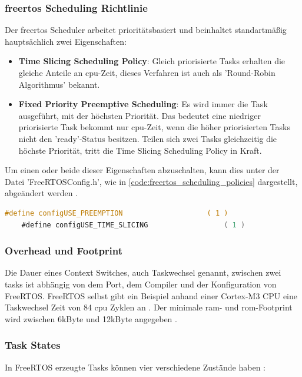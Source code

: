 \documentclass[../EDF Master Thesis.tex]{subfiles}
\begin{document}
\subsubsection{\ac{freertos} Scheduling Richtlinie} \label{section:freertos_scheduling_richtlinie}
Der \ac{freertos} Scheduler arbeitet prioritätsbasiert und beinhaltet standartmäßig hauptsächlich zwei Eigenschaften:
\begin{itemize}
    \item \textbf{Time Slicing Scheduling Policy}: Gleich priorisierte Tasks erhalten die gleiche Anteile an \ac{cpu}-Zeit, dieses Verfahren ist auch als 'Round-Robin Algorithmus' bekannt.
    \item \textbf{Fixed Priority Preemptive Scheduling}: Es wird immer die Task ausgeführt, mit der höchsten Priorität.
                                                         Das bedeutet eine niedriger priorisierte Task bekommt nur \ac{cpu}-Zeit, wenn die höher priorisierten Tasks nicht den 'ready'-Status besitzen.
                                                         Teilen sich zwei Tasks gleichzeitig die höchste Priorität, tritt die Time Slicing Scheduling Policy in Kraft.
\end{itemize}
Um einen oder beide dieser Eigenschaften abzuschalten, kann dies unter der Datei 'FreeRTOSConfig.h', wie in \autoref{code:freertos_scheduling_policies} dargestellt, abgeändert werden \parencite{freertos-scheduling-policy}.
\begin{lstlisting}[language=C, caption=FreeRTOS Scheduling Policy Properties, label=code:freertos_scheduling_policies]
    #define configUSE_PREEMPTION                    ( 1 )
    #define configUSE_TIME_SLICING                  ( 1 )
\end{lstlisting}


\subsubsection{Overhead und Footprint} \label{section:overhead_und_footprint}
Die Dauer eines Context Switches, auch Taskwechsel genannt, zwischen zwei tasks ist abhängig von dem Port, dem Compiler und der Konfiguration von FreeRTOS.
FreeRTOS selbst gibt ein Beispiel anhand einer Cortex-M3 CPU eine Taskwechsel Zeit von 84 \ac{cpu} Zyklen an \parencite{freertos-overhead}.
Der minimale \ac{ram}- und \ac{rom}-Footprint wird zwischen 6kByte und 12kByte angegeben \parencite{freertos-footprint}.

\subsubsection{Task States} \label{section:task_states}
In FreeRTOS erzeugte Tasks können vier verschiedene Zustände haben \parencite{freertos-task-states}:
\end{document}
